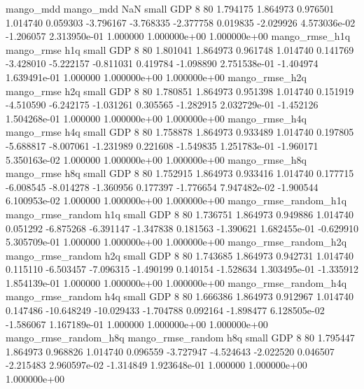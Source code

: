             mango_mdd         mango_mdd                  NaN      small      GDP                 8 80 1.794175       1.864973 0.976501       1.014740    0.059303     -3.796167     -3.768335    -2.377758       0.019835 -2.029926 4.573036e-02    -1.206057   2.313950e-01            1.000000    1.000000e+00        1.000000e+00
       mango_rmse_h1q        mango_rmse                  h1q      small      GDP                 8 80 1.801041       1.864973 0.961748       1.014740    0.141769     -3.428010     -5.222157    -0.811031       0.419784 -1.098890 2.751538e-01    -1.404974   1.639491e-01            1.000000    1.000000e+00        1.000000e+00
       mango_rmse_h2q        mango_rmse                  h2q      small      GDP                 8 80 1.780851       1.864973 0.951398       1.014740    0.151919     -4.510590     -6.242175    -1.031261       0.305565 -1.282915 2.032729e-01    -1.452126   1.504268e-01            1.000000    1.000000e+00        1.000000e+00
       mango_rmse_h4q        mango_rmse                  h4q      small      GDP                 8 80 1.758878       1.864973 0.933489       1.014740    0.197805     -5.688817     -8.007061    -1.231989       0.221608 -1.549835 1.251783e-01    -1.960171   5.350163e-02            1.000000    1.000000e+00        1.000000e+00
       mango_rmse_h8q        mango_rmse                  h8q      small      GDP                 8 80 1.752915       1.864973 0.933416       1.014740    0.177715     -6.008545     -8.014278    -1.360956       0.177397 -1.776654 7.947482e-02    -1.900544   6.100953e-02            1.000000    1.000000e+00        1.000000e+00
mango_rmse_random_h1q mango_rmse_random                  h1q      small      GDP                 8 80 1.736751       1.864973 0.949886       1.014740    0.051292     -6.875268     -6.391147    -1.347838       0.181563 -1.390621 1.682455e-01    -0.629910   5.305709e-01            1.000000    1.000000e+00        1.000000e+00
mango_rmse_random_h2q mango_rmse_random                  h2q      small      GDP                 8 80 1.743685       1.864973 0.942731       1.014740    0.115110     -6.503457     -7.096315    -1.490199       0.140154 -1.528634 1.303495e-01    -1.335912   1.854139e-01            1.000000    1.000000e+00        1.000000e+00
mango_rmse_random_h4q mango_rmse_random                  h4q      small      GDP                 8 80 1.666386       1.864973 0.912967       1.014740    0.147486    -10.648249    -10.029433    -1.704788       0.092164 -1.898477 6.128505e-02    -1.586067   1.167189e-01            1.000000    1.000000e+00        1.000000e+00
mango_rmse_random_h8q mango_rmse_random                  h8q      small      GDP                 8 80 1.795447       1.864973 0.968826       1.014740    0.096559     -3.727947     -4.524643    -2.022520       0.046507 -2.215483 2.960597e-02    -1.314849   1.923648e-01            1.000000    1.000000e+00        1.000000e+00